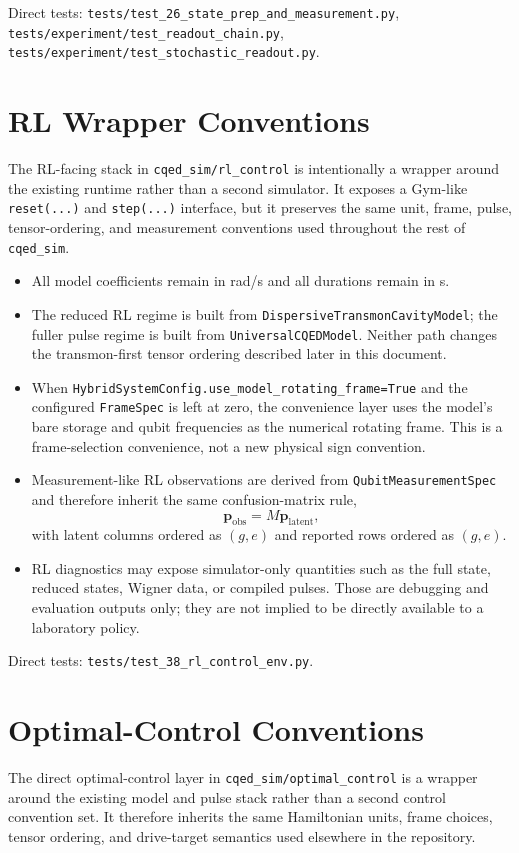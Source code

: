 \documentclass[11pt]{article}
\begin{document}
\noindent
Direct tests:
\texttt{tests/test\_26\_state\_prep\_and\_measurement.py},
\texttt{tests/experiment/test\_readout\_chain.py},
\texttt{tests/experiment/test\_stochastic\_readout.py}.

\section{RL Wrapper Conventions}
The RL-facing stack in \texttt{cqed\_sim/rl\_control} is intentionally a wrapper
around the existing runtime rather than a second simulator. It exposes a
Gym-like \texttt{reset(...)} and \texttt{step(...)} interface, but it preserves
the same unit, frame, pulse, tensor-ordering, and measurement conventions used
throughout the rest of \texttt{cqed\_sim}.

\begin{itemize}[leftmargin=1.5em]
  \item All model coefficients remain in rad/s and all durations remain in s.
  \item The reduced RL regime is built from
  \texttt{DispersiveTransmonCavityModel}; the fuller pulse regime is built from
  \texttt{UniversalCQEDModel}. Neither path changes the transmon-first tensor
  ordering described later in this document.
  \item When \texttt{HybridSystemConfig.use\_model\_rotating\_frame=True} and the
  configured \texttt{FrameSpec} is left at zero, the convenience layer uses the
  model's bare storage and qubit frequencies as the numerical rotating frame.
  This is a frame-selection convenience, not a new physical sign convention.
  \item Measurement-like RL observations are derived from
  \texttt{QubitMeasurementSpec} and therefore inherit the same confusion-matrix
  rule,
  \[
  \mathbf{p}_{\mathrm{obs}} = M \mathbf{p}_{\mathrm{latent}},
  \]
  with latent columns ordered as \((g,e)\) and reported rows ordered as
  \((g,e)\).
  \item RL diagnostics may expose simulator-only quantities such as the full
  state, reduced states, Wigner data, or compiled pulses. Those are debugging
  and evaluation outputs only; they are not implied to be directly available to
  a laboratory policy.
\end{itemize}

\noindent
Direct tests:
\texttt{tests/test\_38\_rl\_control\_env.py}.

\section{Optimal-Control Conventions}
The direct optimal-control layer in \texttt{cqed\_sim/optimal\_control} is a
wrapper around the existing model and pulse stack rather than a second control
convention set. It therefore inherits the same Hamiltonian units, frame choices,
tensor ordering, and drive-target semantics used elsewhere in the repository.
\end{document}
